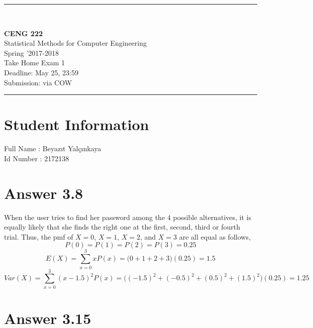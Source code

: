 \documentclass[12pt]{article}
\newcommand{\HRule}{\rule{\linewidth}{1mm}}
\begin{document}
\noindent
\HRule \\[3mm]
\begin{flushright}

                                         \LARGE \textbf{CENG 222}  \\[4mm]
                                         \Large Statistical Methods for Computer Engineering \\[4mm]
                                        \normalsize      Spring '2017-2018 \\
                                           \Large   Take Home Exam 1 \\
                    \normalsize Deadline: May 25, 23:59 \\
                    \normalsize Submission: via COW
\end{flushright}
\HRule

\section*{Student Information }
Full Name : Beyazıt Yalçınkaya \\
Id Number : 2172138 \\

\section*{Answer 3.8}

When the user tries to find her password among the $4$ possible alternatives, it is equally likely that she finds the right one at the first, second, third or fourth trial. Thus, the pmf of $X = 0$, $X = 1$, $X = 2$, and $X = 3$ are all equal as follows,
\begin{equation}
	P(0) = P(1) = P(2) = P(3) = 0.25
\end{equation}
\begin{equation}
	E(X) = \sum_{x = 0}^{3} xP(x) = \big(0 + 1 + 2 + 3\big)(0.25) = 1.5
\end{equation}
\begin{equation}
	Var(X) = \sum_{x = 0}^{3} (x - 1.5)^2P(x) = \big((-1.5)^2 + (-0.5)^2 + (0.5)^2 + (1.5)^2\big)(0.25) = 1.25
\end{equation}

\section*{Answer 3.15}
\end{document}
